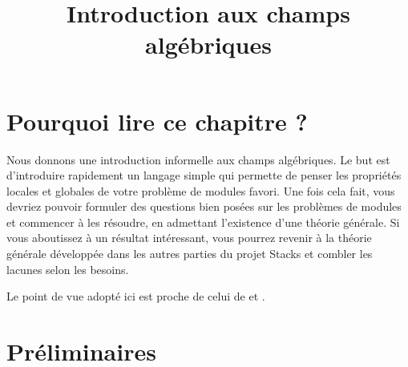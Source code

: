 

%


\title{Introduction aux champs algébriques}

\maketitle

\label{section-phantom}

\tableofcontents




\section{Pourquoi lire ce chapitre ?}
\label{section-introduction}

\noindent
Nous donnons une introduction informelle aux champs algébriques. Le but est
d'introduire rapidement un langage simple qui permette de penser les
propriétés locales et globales de votre problème de modules favori.
Une fois cela fait, vous devriez pouvoir formuler des questions bien posées
sur les problèmes de modules et commencer à les résoudre, en admettant
l'existence d'une théorie générale. Si vous aboutissez à un résultat
intéressant, vous pourrez revenir à la théorie générale développée dans les
autres parties du projet Stacks et combler les lacunes selon les besoins.

\medskip\noindent
Le point de vue adopté ici est proche de celui de
\cite{KatzMazur} et \cite{mumford_picard}.






\section{Préliminaires}
\label{section-preliminary}

